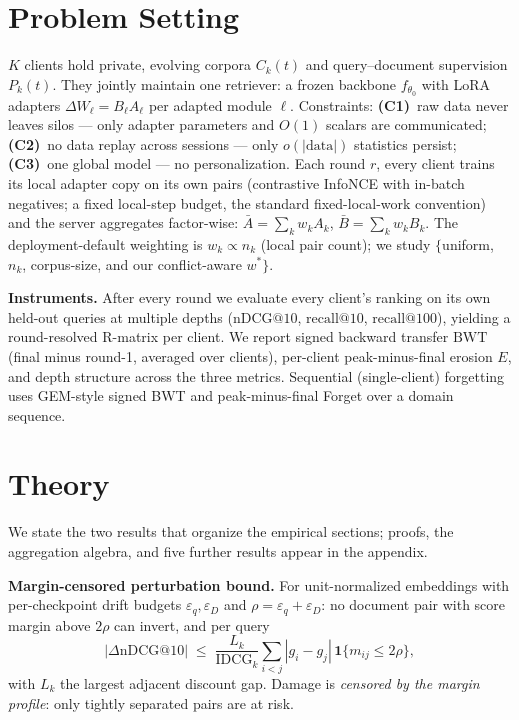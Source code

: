 \documentclass[sigconf,anonymous,review]{acmart}
\makeatletter
\newcommand{\ndcg}{\mathrm{nDCG@10}}
\newcommand{\rc}[1]{\mathrm{recall@#1}}
\newcommand{\BWT}{\mathrm{BWT}}
\makeatother
\begin{document}
\section{Problem Setting}\label{sec:setting}
$K$ clients hold private, evolving corpora $C_k(t)$ and query--document supervision $P_k(t)$. They jointly maintain one retriever: a frozen backbone $f_{\theta_0}$ with LoRA adapters $\Delta W_\ell = B_\ell A_\ell$ per adapted module $\ell$. Constraints: \textbf{(C1)}~raw data never leaves silos --- only adapter parameters and $O(1)$ scalars are communicated; \textbf{(C2)}~no data replay across sessions --- only $o(|\mathrm{data}|)$ statistics persist; \textbf{(C3)}~one global model --- no personalization. Each round $r$, every client trains its local adapter copy on its own pairs (contrastive InfoNCE with in-batch negatives; a fixed local-step budget, the standard fixed-local-work convention) and the server aggregates factor-wise: $\bar A = \sum_k w_k A_k$, $\bar B = \sum_k w_k B_k$. The deployment-default weighting is $w_k \propto n_k$ (local pair count); we study $\{$uniform, $n_k$, corpus-size, and our conflict-aware $w^\ast\}$.

\textbf{Instruments.} After every round we evaluate every client's ranking on its own held-out queries at multiple depths ($\ndcg$, $\rc{10}$, $\rc{100}$), yielding a round-resolved R-matrix per client. We report signed backward transfer $\BWT$ (final minus round-1, averaged over clients), per-client peak-minus-final erosion $E$, and depth structure across the three metrics. Sequential (single-client) forgetting uses GEM-style signed BWT and peak-minus-final Forget over a domain sequence.

\section{Theory}\label{sec:theory}
We state the two results that organize the empirical sections; proofs, the aggregation algebra, and five further results appear in the appendix.

\textbf{Margin-censored perturbation bound.} For unit-normalized embeddings with per-checkpoint drift budgets $\varepsilon_q,\varepsilon_D$ and $\rho=\varepsilon_q+\varepsilon_D$: no document pair with score margin above $2\rho$ can invert, and per query
\[ |\Delta\ndcg| \;\le\; \frac{L_k}{\mathrm{IDCG}_k}\sum_{i<j}|g_i-g_j|\,\mathbf{1}\{m_{ij}\le 2\rho\}, \]
with $L_k$ the largest adjacent discount gap. Damage is \emph{censored by the margin profile}: only tightly separated pairs are at risk.
\end{document}
